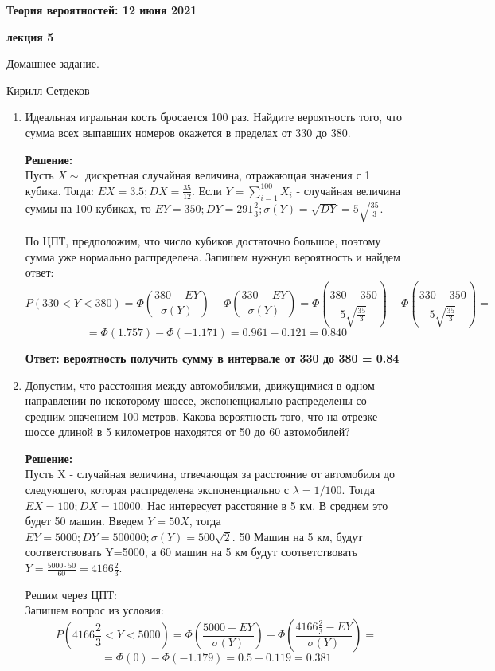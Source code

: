 \documentclass[a4paper,12pt]{article}
\newcounter{z}
\renewcommand{\date}{{\bf 12 июня 2021}}
\newcommand{\HSEhat}{
\vspace*{-0pt}
\noindent
\setcounter{z}{0}


{\bf \phantom{\date}  \large \hfill Теория вероятностей: \hfill \normalsize \date}

\vspace{5 pt}
{\bf \large \hfill  лекция 5\hfill }

\vspace{15 pt}
\centerline{ \large  Домашнее задание.}
\centerline{ \large  Кирилл Сетдеков}



\vspace*{10pt}
\setcounter{z}{0}

}
\begin{document}
\HSEhat


\begin{enumerate}

\subsection*{Задачи:}

\item Идеальная игральная кость бросается 100 раз. Найдите вероятность того, что сумма всех выпавших номеров окажется в пределах от 330 до 380. 

\textbf{Решение:}\\
Пусть $X \sim $ дискретная случайная величина, отражающая значения с 1 кубика. Тогда: $EX = 3.5; DX = \frac{35}{12}$. Если $Y=\sum_{i=1}^{100} X_i$ - случайная величина суммы на 100 кубиках, то $EY =350; DY=291\frac{2}{3}; \sigma (Y) = \sqrt{DY}=5\sqrt{\frac{35}{3}}$.

По ЦПТ, предположим, что число кубиков достаточно большое, поэтому сумма уже нормально распределена. Запишем нужную вероятность и найдем ответ:
$$P(330<Y<380)=\Phi(\frac{380-EY}{\sigma (Y)})-\Phi(\frac{330-EY}{\sigma (Y)})=\Phi(\frac{380-350}{5\sqrt{\frac{35}{3}}})-\Phi(\frac{330-350}{5\sqrt{\frac{35}{3}}})=$$
$$=\Phi(1.757)-\Phi(-1.171)=0.961-0.121=0.840$$

\textbf{Ответ: вероятность получить сумму в интервале от 330 до 380 = 0.84} 

\item Допустим, что расстояния между автомобилями, движущимися в одном направлении по некоторому шоссе, экспоненциально распределены со средним значением 100 метров. Какова вероятность того, что на отрезке шоссе длиной в 5 километров находятся от 50 до 60 автомобилей? 

\textbf{Решение:}\\
Пусть X - случайная величина, отвечающая за расстояние от автомобиля до следующего, которая распределена экспоненциально с $\lambda=1/100$. Тогда $EX =100; DX = 10000$. Нас интересует расстояние в 5 км. В среднем это будет 50 машин. Введем $Y=50X$, тогда $EY=5000; DY=500000; \sigma (Y) = 500\sqrt{2}$.
50 Машин на 5 км, будут соответствовать Y=5000, а 60 машин на 5 км будут соответствовать $Y=\frac{5000 \cdot 50}{60} = 4166 \frac{2}{3}$.

Решим через ЦПТ:\\
Запишем вопрос из условия:
$$P(4166 \frac{2}{3} < Y < 5000)=\Phi(\frac{5000-EY}{\sigma (Y)})-\Phi(\frac{4166 \frac{2}{3}-EY}{\sigma (Y)})=$$
$$=\Phi(0)-\Phi(-1.179)=0.5-0.119=0.381$$


\end{enumerate}
\end{document}
